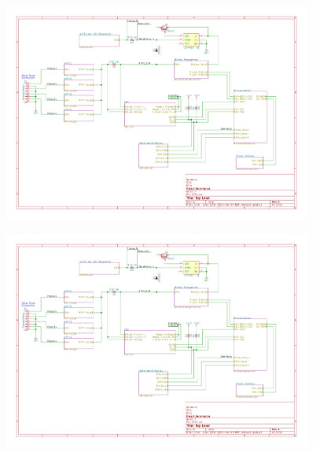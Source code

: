 \documentclass{article}
\begin{document}
{\begin{figure}[H]
	\centering
	\includegraphics[page=11,width=0.9\textwidth]{RFCxSchematics.pdf}
	\caption{}
	\label{fig:schemp11}
\end{figure}

\begin{figure}[H]
	\centering
	\includegraphics[page=1,width=0.9\textwidth]{RFCxSchematics.pdf}
	\caption{}
	\label{fig:schemp1}
\end{figure}

\newpage
}
\end{document}
